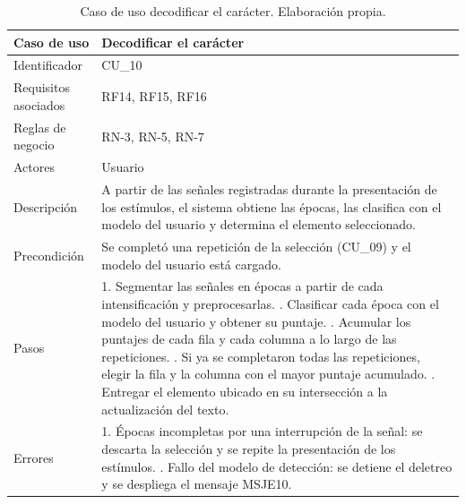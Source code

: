 \begin{table}[H]
\centering
\small
\begin{tabularx}{\textwidth}{|L{3.0cm}|Y|}
\hline
\textbf{Caso de uso} & \textbf{Decodificar el carácter} \\
\hline
Identificador & CU\_10 \\
\hline
Requisitos asociados & RF14, RF15, RF16 \\
\hline
Reglas de negocio & RN-3, RN-5, RN-7 \\
\hline
Actores & Usuario \\
\hline
Descripción & A partir de las señales registradas durante la presentación de los estímulos, el sistema obtiene las épocas, las clasifica con el modelo del usuario y determina el elemento seleccionado. \\
\hline
Precondición & Se completó una repetición de la selección (CU\_09) y el modelo del usuario está cargado. \\
\hline
Pasos & 1. Segmentar las señales en épocas a partir de cada intensificación y preprocesarlas. . Clasificar cada época con el modelo del usuario y obtener su puntaje. . Acumular los puntajes de cada fila y cada columna a lo largo de las repeticiones. . Si ya se completaron todas las repeticiones, elegir la fila y la columna con el mayor puntaje acumulado. . Entregar el elemento ubicado en su intersección a la actualización del texto. \\
\hline
Errores & 1. Épocas incompletas por una interrupción de la señal: se descarta la selección y se repite la presentación de los estímulos. . Fallo del modelo de detección: se detiene el deletreo y se despliega el mensaje MSJE10. \\
\hline
\end{tabularx}
\caption{Caso de uso decodificar el carácter. Elaboración propia.}
\label{tab:cu10}
\end{table}

